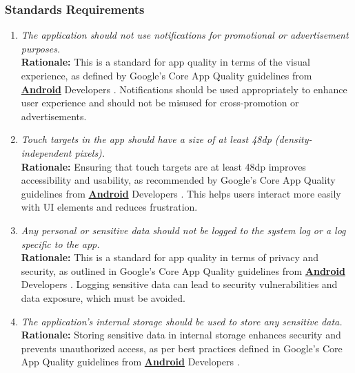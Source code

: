 \documentclass[]{article}
\begin{document}
\subsubsection{Standards Requirements}
\label{ssub:standards_requirements}
\begin{enumerate}[{LR-STD}1. ]
    \item \textit{The application should not use notifications for promotional or advertisement purposes.}
    \\ \textbf{Rationale:} This is a standard for app quality in terms of the visual experience, as defined by Google's Core App Quality guidelines from \hyperref[Android]{\textbf{Android}} Developers \cite{GoogleCoreAppQuality}. Notifications should be used appropriately to enhance user experience and should not be misused for cross-promotion or advertisements.

    \item \textit{Touch targets in the app should have a size of at least 48dp (density-independent pixels).}
    \\ \textbf{Rationale:} Ensuring that touch targets are at least 48dp improves accessibility and usability, as recommended by Google's Core App Quality guidelines from \hyperref[Android]{\textbf{Android}} Developers \cite{GoogleCoreAppQuality}. This helps users interact more easily with UI elements and reduces frustration.

    \item \textit{Any personal or sensitive data should not be logged to the system log or a log specific to the app.}
    \\ \textbf{Rationale:} This is a standard for app quality in terms of privacy and security, as outlined in Google's Core App Quality guidelines from \hyperref[Android]{\textbf{Android}} Developers \cite{GoogleCoreAppQuality}. Logging sensitive data can lead to security vulnerabilities and data exposure, which must be avoided.

    \item \textit{The application's internal storage should be used to store any sensitive data.}
    \\ \textbf{Rationale:} Storing sensitive data in internal storage enhances security and prevents unauthorized access, as per best practices defined in Google's Core App Quality guidelines from \hyperref[Android]{\textbf{Android}} Developers \cite{GoogleCoreAppQuality}.
\end{enumerate}
\end{document}
